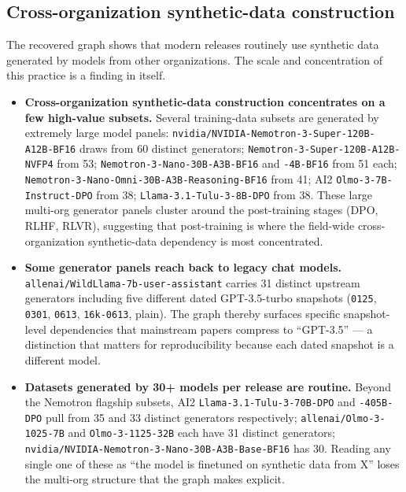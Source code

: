 \subsection{Cross-organization synthetic-data construction}

The recovered graph shows that modern releases routinely use synthetic data generated by models from other organizations. The scale and concentration of this practice is a finding in itself.

\begin{itemize}
    \item \textbf{Cross-organization synthetic-data construction concentrates on a few high-value subsets.}
    Several training-data subsets are generated by extremely large model panels: \texttt{nvidia/NVIDIA-Nemotron-3-Super-120B-A12B-BF16} draws from 60 distinct generators; \texttt{Nemotron-3-Super-120B-A12B-NVFP4} from 53; \texttt{Nemotron-3-Nano-30B-A3B-BF16} and \texttt{-4B-BF16} from 51 each; \texttt{Nemotron-3-Nano-Omni-30B-A3B-Reasoning-BF16} from 41; AI2 \texttt{Olmo-3-7B-Instruct-DPO} from 38; \texttt{Llama-3.1-Tulu-3-8B-DPO} from 38. These large multi-org generator panels cluster around the post-training stages (DPO, RLHF, RLVR), suggesting that post-training is where the field-wide cross-organization synthetic-data dependency is most concentrated.

    \item \textbf{Some generator panels reach back to legacy chat models.}
    \texttt{allenai/WildLlama-7b-user-assistant} carries 31 distinct upstream generators including five different dated GPT-3.5-turbo snapshots (\texttt{0125}, \texttt{0301}, \texttt{0613}, \texttt{16k-0613}, plain). The graph thereby surfaces specific snapshot-level dependencies that mainstream papers compress to ``GPT-3.5'' --- a distinction that matters for reproducibility because each dated snapshot is a different model.

    \item \textbf{Datasets generated by 30+ models per release are routine.}
    Beyond the Nemotron flagship subsets, AI2 \texttt{Llama-3.1-Tulu-3-70B-DPO} and \texttt{-405B-DPO} pull from 35 and 33 distinct generators respectively; \texttt{allenai/Olmo-3-1025-7B} and \texttt{Olmo-3-1125-32B} each have 31 distinct generators; \texttt{nvidia/NVIDIA-Nemotron-3-Nano-30B-A3B-Base-BF16} has 30. Reading any single one of these as ``the model is finetuned on synthetic data from X'' loses the multi-org structure that the graph makes explicit.
\end{itemize}
